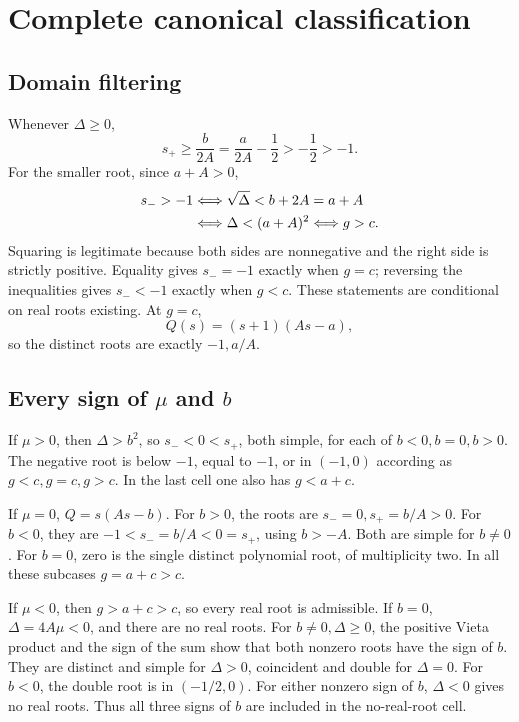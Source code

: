 \documentclass[11pt]{article}
\begin{document}
\section{Complete canonical classification}

\subsection{Domain filtering}
Whenever \(\Delta\ge0\),
\[
s_+\ge\frac b{2A}=\frac a{2A}-\frac12>-\frac12>-1.
\]
For the smaller root, since \(a+A>0\),
\begin{align}
s_->-1
&\Longleftrightarrow \sqrt{\Delta}<b+2A=a+A\notag\\
&\Longleftrightarrow \Delta<(a+A)^2
\Longleftrightarrow g>c.
\label{A02:domain}
\end{align}
Squaring is legitimate because both sides are nonnegative and the
right side is strictly positive. Equality gives \(s_-=-1\) exactly
when \(g=c\); reversing the inequalities gives \(s_-<-1\) exactly
when \(g<c\). These statements are conditional on real roots existing.
At \(g=c\),
\[
Q(s)=(s+1)(As-a),
\]
so the distinct roots are exactly \(-1,a/A\).

\subsection{Every sign of \texorpdfstring{\(\mu\) and \(b\)}{mu and b}}
If \(\mu>0\), then \(\Delta>b^2\), so \(s_-<0<s_+\), both simple,
for each of \(b<0,b=0,b>0\). The negative root is below \(-1\),
equal to \(-1\), or in \((-1,0)\) according as \(g<c,g=c,g>c\).
In the last cell one also has \(g<a+c\).

If \(\mu=0\), \(Q=s(As-b)\). For \(b>0\), the roots are
\(s_-=0,s_+=b/A>0\). For \(b<0\), they are
\(-1<s_-=b/A<0=s_+\), using \(b>-A\). Both are simple for \(b\ne0\).
For \(b=0\), zero is the single distinct polynomial root, of
multiplicity two. In all these subcases \(g=a+c>c\).

If \(\mu<0\), then \(g>a+c>c\), so every real root is admissible.
If \(b=0\), \(\Delta=4A\mu<0\), and there are no real roots.
For \(b\ne0,\Delta\ge0\), the positive Vieta product and the sign of
the sum show that both nonzero roots have the sign of \(b\).
They are distinct and simple for \(\Delta>0\), coincident and double
for \(\Delta=0\). For \(b<0\), the double root is in \((-1/2,0)\).
For either nonzero sign of \(b\), \(\Delta<0\) gives no real roots.
Thus all three signs of \(b\) are included in the no-real-root cell.
\end{document}
